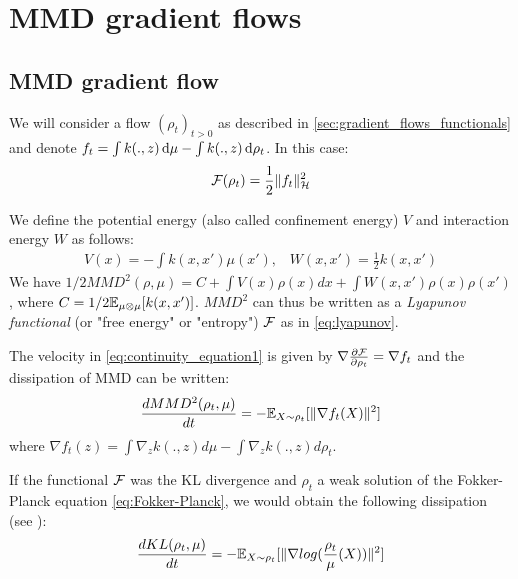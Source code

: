 

\section{MMD gradient flows}\label{sec:mmd_flow}

\subsection{MMD gradient flow}

We will consider a flow $(\rho_t)_{t>0}$ as described in \cref{sec:gradient_flows_functionals} and denote $f_t= \int k(.,z)\mathop{}\!\mathrm{d} \mu - \int k(.,z)\mathop{}\!\mathrm{d} \rho_t$. In this case:
\begin{equation}
{{\mathcal F}}(\rho_t)=\frac{1}{2}\|f_t\|^2_{{{\mathcal H}}}
\end{equation} 

We define the potential energy (also called confinement energy) $V$ and interaction energy $W$ as follows:
\begin{align*}
	V(x)=-\int  k(x,x')\mu(x')\text{,} \quad
W(x,x')=\frac{1}{2}k(x,x')
\end{align*}
We have $1/2MMD^2(\rho,\mu)=C+ \int V(x) \rho(x)dx + \int W(x,x')\rho(x)\rho(x')$, where $C=1/2{{\mathbb E}}_{\mu\otimes \mu}[k(x,x')]$. $MMD^2$ can thus be written as a \textit{Lyapunov functional} (or "free energy" or "entropy") ${{\mathcal F}}$ as in \cref{eq:lyapunov}.

\begin{proposition}\label{prop:mmd_flow}
 The velocity in \cref{eq:continuity_equation1} is given by $\nabla \frac{\partial{{{\mathcal F}}}}{\partial{\rho_t}}=\nabla f_t$ and the dissipation of MMD can be written:  
	\begin{equation}
	\frac{d MMD^2(\rho_t, \mu)}{dt}=-{{\mathbb E}}_{X \sim \rho_t}[\|\nabla f_t(X)\|^2]
	\end{equation}
	where $\nabla f_t(z)= \int \nabla_{z}k(.,z) d\mu -  \int \nabla_{z}k(.,z) d\rho_t$.
\end{proposition}

\begin{remark}
	If the functional ${{\mathcal F}}$ was the KL divergence and $\rho_t$ a weak solution of the Fokker-Planck equation \cref{eq:Fokker-Planck}, we would obtain the following dissipation (see \cite{wibisono2018sampling}):
	\begin{align}\label{eq:decreasing_mmd}
	\frac{d KL(\rho_t, \mu)}{dt}=-{{\mathbb E}}_{X \sim \rho_t}[\|\nabla log(\frac{\rho_t}{\mu}(X))\|^2]
	\end{align}
\end{remark}


